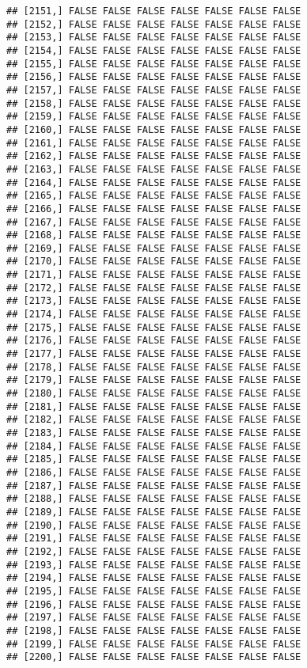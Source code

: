 \documentclass[
]{article}
\begin{document}
\begin{verbatim}
## [2151,] FALSE FALSE FALSE FALSE FALSE FALSE FALSE
## [2152,] FALSE FALSE FALSE FALSE FALSE FALSE FALSE
## [2153,] FALSE FALSE FALSE FALSE FALSE FALSE FALSE
## [2154,] FALSE FALSE FALSE FALSE FALSE FALSE FALSE
## [2155,] FALSE FALSE FALSE FALSE FALSE FALSE FALSE
## [2156,] FALSE FALSE FALSE FALSE FALSE FALSE FALSE
## [2157,] FALSE FALSE FALSE FALSE FALSE FALSE FALSE
## [2158,] FALSE FALSE FALSE FALSE FALSE FALSE FALSE
## [2159,] FALSE FALSE FALSE FALSE FALSE FALSE FALSE
## [2160,] FALSE FALSE FALSE FALSE FALSE FALSE FALSE
## [2161,] FALSE FALSE FALSE FALSE FALSE FALSE FALSE
## [2162,] FALSE FALSE FALSE FALSE FALSE FALSE FALSE
## [2163,] FALSE FALSE FALSE FALSE FALSE FALSE FALSE
## [2164,] FALSE FALSE FALSE FALSE FALSE FALSE FALSE
## [2165,] FALSE FALSE FALSE FALSE FALSE FALSE FALSE
## [2166,] FALSE FALSE FALSE FALSE FALSE FALSE FALSE
## [2167,] FALSE FALSE FALSE FALSE FALSE FALSE FALSE
## [2168,] FALSE FALSE FALSE FALSE FALSE FALSE FALSE
## [2169,] FALSE FALSE FALSE FALSE FALSE FALSE FALSE
## [2170,] FALSE FALSE FALSE FALSE FALSE FALSE FALSE
## [2171,] FALSE FALSE FALSE FALSE FALSE FALSE FALSE
## [2172,] FALSE FALSE FALSE FALSE FALSE FALSE FALSE
## [2173,] FALSE FALSE FALSE FALSE FALSE FALSE FALSE
## [2174,] FALSE FALSE FALSE FALSE FALSE FALSE FALSE
## [2175,] FALSE FALSE FALSE FALSE FALSE FALSE FALSE
## [2176,] FALSE FALSE FALSE FALSE FALSE FALSE FALSE
## [2177,] FALSE FALSE FALSE FALSE FALSE FALSE FALSE
## [2178,] FALSE FALSE FALSE FALSE FALSE FALSE FALSE
## [2179,] FALSE FALSE FALSE FALSE FALSE FALSE FALSE
## [2180,] FALSE FALSE FALSE FALSE FALSE FALSE FALSE
## [2181,] FALSE FALSE FALSE FALSE FALSE FALSE FALSE
## [2182,] FALSE FALSE FALSE FALSE FALSE FALSE FALSE
## [2183,] FALSE FALSE FALSE FALSE FALSE FALSE FALSE
## [2184,] FALSE FALSE FALSE FALSE FALSE FALSE FALSE
## [2185,] FALSE FALSE FALSE FALSE FALSE FALSE FALSE
## [2186,] FALSE FALSE FALSE FALSE FALSE FALSE FALSE
## [2187,] FALSE FALSE FALSE FALSE FALSE FALSE FALSE
## [2188,] FALSE FALSE FALSE FALSE FALSE FALSE FALSE
## [2189,] FALSE FALSE FALSE FALSE FALSE FALSE FALSE
## [2190,] FALSE FALSE FALSE FALSE FALSE FALSE FALSE
## [2191,] FALSE FALSE FALSE FALSE FALSE FALSE FALSE
## [2192,] FALSE FALSE FALSE FALSE FALSE FALSE FALSE
## [2193,] FALSE FALSE FALSE FALSE FALSE FALSE FALSE
## [2194,] FALSE FALSE FALSE FALSE FALSE FALSE FALSE
## [2195,] FALSE FALSE FALSE FALSE FALSE FALSE FALSE
## [2196,] FALSE FALSE FALSE FALSE FALSE FALSE FALSE
## [2197,] FALSE FALSE FALSE FALSE FALSE FALSE FALSE
## [2198,] FALSE FALSE FALSE FALSE FALSE FALSE FALSE
## [2199,] FALSE FALSE FALSE FALSE FALSE FALSE FALSE
## [2200,] FALSE FALSE FALSE FALSE FALSE FALSE FALSE

\end{verbatim}
\end{document}

